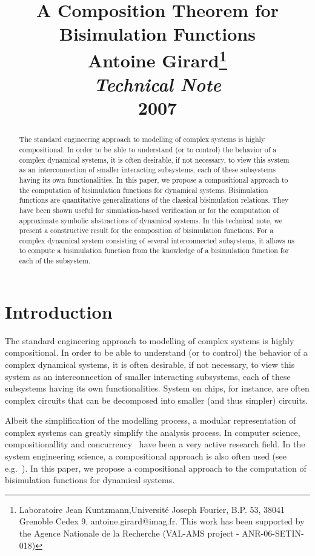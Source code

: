 \documentclass[a4paper,12pt,twoside]{article}
\title{
\vspace{-3cm}
{\LARGE  A Composition Theorem for\\ Bisimulation Functions} \\
\vspace{0.8cm}
{\Large Antoine Girard}\thanks{Laboratoire Jean Kuntzmann,Universit\'e Joseph Fourier, B.P. 53, 38041 Grenoble Cedex 9,
antoine.girard@imag.fr. This work has been supported by the Agence Nationale de la Recherche (VAL-AMS project - ANR-06-SETIN-018)}\\
\vspace{0.5cm}
{\large {\it Technical Note}}\\
\vspace{0cm}
\vspace{0.2cm}
{\large 2007}
}
\date{}
\begin{document}
\maketitle

\vspace{-2cm}

\begin{abstract}
The standard engineering approach to modelling of complex systems is highly compositional.
In order to be able to understand (or to control) the behavior of a complex dynamical systems,
it is often desirable, if not necessary, to view this system as an interconnection of smaller
interacting subsystems, each of these subsystems having its own functionalities.
In this paper, we propose a compositional approach to the computation of bisimulation functions for dynamical systems.
Bisimulation functions are quantitative generalizations of the classical
bisimulation relations. They have been shown useful for simulation-based verification or for the computation of approximate symbolic abstractions of dynamical systems. In this technical note, we present a constructive result for the composition of bisimulation functions.
For a complex dynamical system consisting of several interconnected subsystems,
it allows us to compute a bisimulation function from the knowledge of a bisimulation function for each of the subsystem.

\end{abstract}





\newpage
\section{Introduction}

The standard engineering approach to modelling of complex systems is highly compositional.
In order to be able to understand (or to control) the behavior of a complex dynamical systems,
it is often desirable, if not necessary, to view this system as an interconnection of smaller
interacting subsystems, each of these subsystems having its own functionalities. System
on chips, for instance, are often complex circuits that can be decomposed into smaller (and thus simpler)
circuits.

Albeit the simplification of the modelling process, a modular representation of complex systems
can greatly simplify the analysis process. In computer science, compositionallity and concurrency~\cite{Milner89}
have been a very active research field. In the system engineering science, a compositional approach is also
often used (see e.g.~\cite{Jiang96}). In this paper, we propose a compositional approach to the computation of bisimulation functions for dynamical systems.
\end{document}
